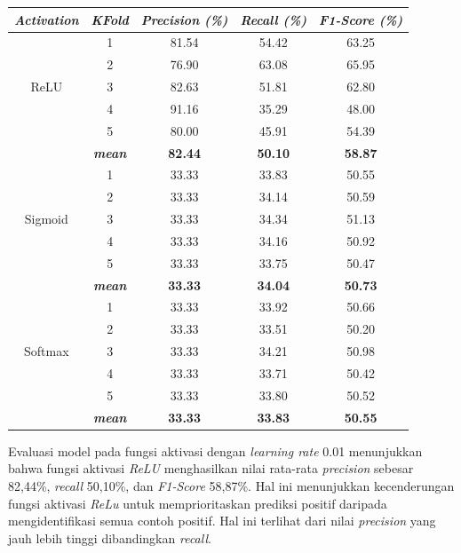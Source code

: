 \begin{table}[H]
\begin{table}[H]
\begin{tabular}{ccccc}
            \textbf{\textit{Activation}} & \multicolumn{1}{c}{\textbf{\textit{KFold}}} & \textbf{\textit{Precision (\%)} } & \textbf{\textit{Recall (\%)}} & \textbf{\textit{F1-Score (\%)}}  \\
    
            \midrule
            \multirow{5}{*}{ReLU} 

            & 1 & 81.54 & 54.42 & 63.25  \\
            & 2 & 76.90 & 63.08 & 65.95 \\
            & 3 & 82.63 & 51.81 & 62.80\\
            & 4 & 91.16 & 35.29 & 48.00\\
            & 5 & 80.00 & 45.91 & 54.39 \\ 
            & \textbf{\textit{mean}}& \textbf{82.44} & \textbf{50.10} & \textbf{58.87} \\ \hline
            
            \multirow{5}{*}{Sigmoid}
            & 1 &  33.33 & 33.83 & 50.55  \\
            & 2 &  33.33  & 34.14 & 50.59 \\
            & 3 &  33.33  & 34.34 & 51.13 \\
            & 4 &  33.33  & 34.16 & 50.92 \\
            & 5 &  33.33  & 33.75 & 50.47 \\
            & \textit{\textbf{mean}}& \textbf{33.33} & \textbf{34.04} &\textbf{50.73} \\ 
                        \hline
    
            \multirow{5}{*}{Softmax}
            & 1 & 33.33  & 33.92 & 50.66 \\
            & 2 & 33.33  & 33.51 & 50.20 \\
            & 3 & 33.33  & 34.21 & 50.98  \\
            & 4 & 33.33  & 33.71 & 50.42 \\
            & 5 & 33.33  & 33.80 & 50.52 \\
            & \textit{\textbf{mean}}& \textbf{33.33} & \textbf{33.83} &\textbf{50.55} \\ 
    

            \bottomrule
        \end{tabular}
        \label{Evaluasi Learning Rate 0.01 }
    \end{table}

      Evaluasi model pada fungsi aktivasi dengan \textit{learning rate} 0.01 menunjukkan bahwa fungsi aktivasi \textit{ReLU} menghasilkan nilai rata-rata \textit{precision} sebesar 82,44\%, \textit{recall} 50,10\%, dan\textit{ F1-Score} 58,87\%. Hal ini menunjukkan kecenderungan fungsi aktivasi \textit{ReLu} untuk memprioritaskan prediksi positif daripada mengidentifikasi semua contoh positif. Hal ini terlihat dari nilai \textit{precision} yang jauh lebih tinggi dibandingkan \textit{recall}.


\end{table}
